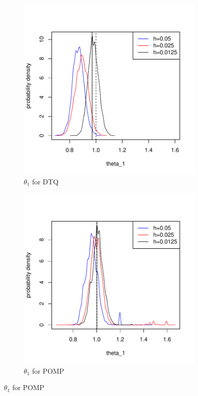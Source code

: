 \documentclass[a4paper,11pt]{article}
\begin{document}
\begin{figure}[H]
\begin{subfigure}{0.48\textwidth}
\includegraphics[width=\linewidth]{dtq_theta1.pdf}
\caption{$\theta_1$ for DTQ} \label{fig:a}
\end{subfigure}\hspace*{\fill}
\begin{subfigure}{0.48\textwidth}
\includegraphics[width=\linewidth]{pomp_theta1.pdf}
\caption{$\theta_1$ for POMP} \label{fig:b}
\end{subfigure}


\end{figure}
\end{document}
